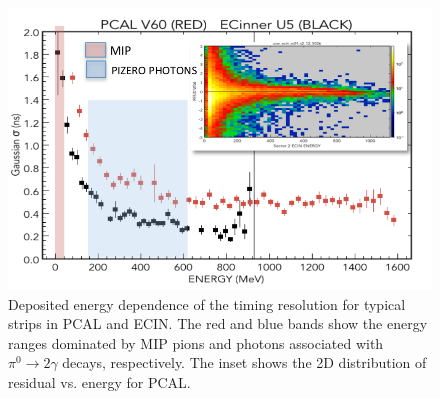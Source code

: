 \begin{figure}[hbt]
\centering
\includegraphics[width=1.0\columnwidth,keepaspectratio]{img/S9_2_2.png}
\caption[]{Deposited energy dependence of the timing resolution for typical strips in PCAL and ECIN. The red
  and blue bands show the energy ranges dominated by MIP pions and photons associated with
  $\pi^0\rightarrow 2\gamma$ decays, respectively. The inset shows the 2D distribution of residual vs. energy
  for PCAL.}
\label{fig:S9_2_2}
\end{figure}


